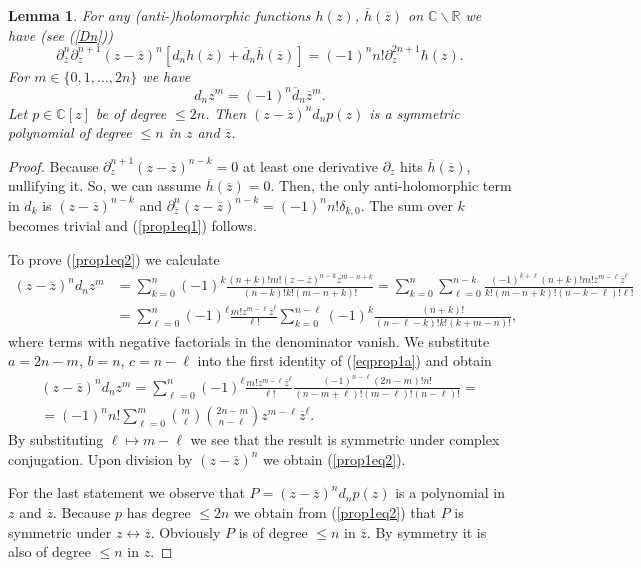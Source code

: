 \documentclass[oneside]{amsart}
\newcommand{\CC}{{\mathbb C}}
\newcommand{\RR}{{\mathbb R}}
\newcommand{\ddd}{{\overline{d}}}
\newcommand{\hh}{{\overline{h}}}
\newcommand{\zz}{{\overline{z}}}
\theoremstyle{plain}
\newtheorem{lem}[thm]{Lemma}
\begin{document}
\begin{lem}\label{lem1}
For any (anti-)holomorphic functions $h(z)$, $\hh(\zz)$ on $\CC\backslash\RR$ we have (see (\ref{Dn}))
\begin{equation}\label{prop1eq1}
\partial_\zz^n\partial_z^{n+1}(z-\zz)^n[d_nh(z)+\ddd_n\hh(\zz)]=(-1)^nn!\partial_z^{2n+1}h(z).
\end{equation}
For $m\in\{0,1,\ldots,2n\}$ we have
\begin{equation}\label{prop1eq2}
d_nz^m=(-1)^n\ddd_n\zz^m.
\end{equation}
Let $p\in\CC[z]$ be of degree $\leq2n$. Then $(z-\zz)^nd_np(z)$ is a symmetric polynomial of degree $\leq n$ in $z$ and $\zz$.
\end{lem}
\begin{proof}
Because $\partial_z^{n+1}(z-\zz)^{n-k}=0$ at least one derivative $\partial_z$ hits $\hh(\zz)$, nullifying it. So, we can assume $\hh(\zz)=0$.
Then, the only anti-holomorphic term in $d_k$ is $(z-\zz)^{n-k}$ and $\partial_\zz^n(z-\zz)^{n-k}=(-1)^nn!\delta_{k,0}$. The sum over $k$ becomes trivial and (\ref{prop1eq1}) follows.

To prove (\ref{prop1eq2}) we calculate
\begin{align*}
(z-\zz)^nd_nz^m&=\sum_{k=0}^n(-1)^k\frac{(n+k)!m!(z-\zz)^{n-k}z^{m-n+k}}{(n-k)!k!(m-n+k)!}
=\sum_{k=0}^n\sum_{\ell=0}^{n-k}\frac{(-1)^{k+\ell}(n+k)!m!z^{m-\ell}\zz^\ell}{k!(m-n+k)!(n-k-\ell)!\ell!}\\
&=\sum_{\ell=0}^n(-1)^\ell\frac{m!z^{m-\ell}\zz^\ell}{\ell!}\sum_{k=0}^{n-\ell}(-1)^k\frac{(n+k)!}{(n-\ell-k)!k!(k+m-n)!},
\end{align*}
where terms with negative factorials in the denominator vanish.
We substitute $a=2n-m$, $b=n$, $c=n-\ell$ into the first identity of (\ref{eqprop1a}) and obtain
\begin{gather*}
(z-\zz)^nd_nz^m=\sum_{\ell=0}^n(-1)^\ell\frac{m!z^{m-\ell}\zz^\ell}{\ell!}\frac{(-1)^{n-\ell}(2n-m)!n!}{(n-m+\ell)!(m-\ell)!(n-\ell)!}
=\\
=(-1)^nn!\sum_{\ell=0}^m\genfrac(){0pt}{}{m}{\ell}\genfrac(){0pt}{}{2n-m}{n-\ell}z^{m-\ell}\zz^\ell.
\end{gather*}
By substituting $\ell\mapsto m-\ell$ we see that the result is symmetric under complex conjugation. Upon division by $(z-\zz)^n$ we obtain (\ref{prop1eq2}).

For the last statement we observe that $P=(z-\zz)^nd_np(z)$ is a polynomial in $z$ and $\zz$. Because $p$ has degree $\leq2n$ we obtain from (\ref{prop1eq2}) that $P$ is symmetric
under $z\leftrightarrow\zz$. Obviously $P$ is of degree $\leq n$ in $\zz$. By symmetry it is also of degree $\leq n$ in $z$.
\end{proof}
\end{document}
